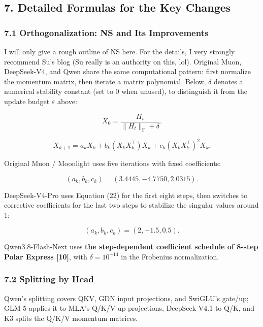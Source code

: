 \documentclass[
  english,
  10pt,
  a4paper,
]{article}
\newcommand{\ComparisonTableEnd}{%
  \clearpage
  \endgroup
  \restoregeometry
  \special{papersize=210mm,297mm}
  \setlength{\headwidth}{\textwidth}
}
\begin{document}
\ComparisonTableEnd

\subsection{7. Detailed Formulas for the Key
Changes}\label{detailed-formulas-for-the-key-changes}

\subsubsection{7.1 Orthogonalization: NS and Its
Improvements}\label{orthogonalization-ns-and-its-improvements}

I will only give a rough outline of NS here. For the details, I very
strongly recommend Su's blog (Su really is an authority on this, lol).
Original Muon, DeepSeek-V4, and Qwen share the same computational
pattern: first normalize the momentum matrix, then iterate a matrix
polynomial. Below, \(\delta\) denotes a numerical stability constant
(set to 0 when unused), to distinguish it from the update budget
\(\varepsilon\) above:

\nopagebreak[4]

\[
X_0=\frac{H_t}{\|H_t\|_{\mathrm F}+\delta}.
\tag{20}
\]

\nopagebreak[4]

\[
\boxed{X_{k+1}=a_kX_k+b_k(X_kX_k^\top)X_k+c_k(X_kX_k^\top)^2X_k.}
\tag{21}
\]

Original Muon / Moonlight uses five iterations with fixed coefficients:

\nopagebreak[4]

\[
(a_k,b_k,c_k)=(3.4445,-4.7750,2.0315).
\tag{22}
\]

DeepSeek-V4-Pro uses Equation (22) for the first eight steps, then
switches to corrective coefficients for the last two steps to stabilize
the singular values around 1:

\nopagebreak[4]

\[
(a_k,b_k,c_k)=(2,-1.5,0.5).
\tag{23}
\]

Qwen3.8-Flash-Next uses \textbf{the step-dependent coefficient schedule
of 8-step Polar Express {[}10{]}}, with \(\delta=10^{-14}\) in the
Frobenius normalization.

\subsubsection{7.2 Splitting by Head}\label{splitting-by-head}

Qwen's splitting covers QKV, GDN input projections, and SwiGLU's
gate/up; GLM-5 applies it to MLA's Q/K/V up-projections, DeepSeek-V4.1
to Q/K, and K3 splits the Q/K/V momentum matrices.
\end{document}
